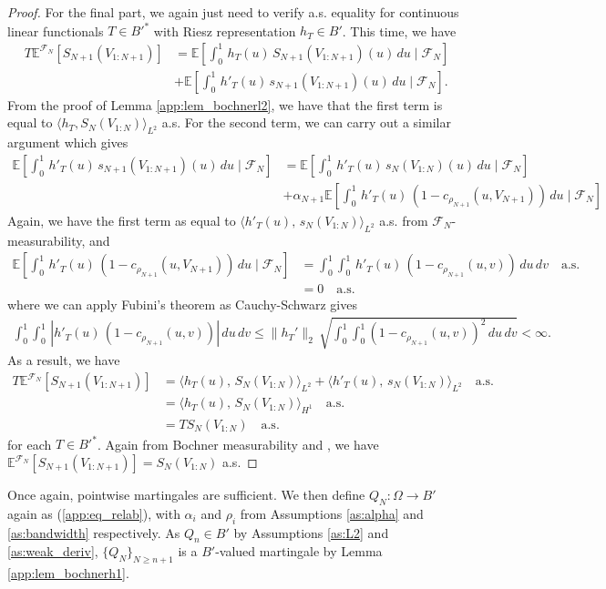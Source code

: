 \documentclass[11pt,a4paper]{article}
\newcommand{\E}{\mathbb{E}}
\begin{document}
\begin{appendices}
\begin{proof}
For the final part, we again just need to verify a.s. equality for continuous linear functionals $T \in {B'}^*$ with Riesz representation $h_T \in B'$. This time, we have
\begin{align*}
    T\E^{\mathcal{F}_N}[S_{N+1}(V_{1:N+1})] &= \E\left[\int_0^1 \, h_T(u) \, S_{N+1}(V_{1:N+1})(u) \, du \mid \mathcal{F}_N\right]\\
    &+ \E\left[\int_0^1 \, h'_T(u) \, s_{N+1}(V_{1:N+1})(u) \, du \mid \mathcal{F}_N\right].
\end{align*}
 From the proof of {Lemma \ref{app:lem_bochnerl2}}, we have that the first term is equal to $\langle h_T, S_N(V_{1:N}) \rangle_{L^2}$ a.s. For the second term, we can carry out a similar argument which gives
\begin{align*}
    \E\left[\int_0^1 \, h'_T(u) \, s_{N+1}(V_{1:N+1})(u) \, du \mid \mathcal{F}_N\right] &=  \E\left[\int_0^1 \, h'_T(u) \, s_{N}(V_{1:N})(u) \, du \mid \mathcal{F}_N\right]\\
    &+ \alpha_{N+1}  \E\left[\int_0^1 \, h'_T(u) \, (1 - c_{\rho_{N+1}}(u,V_{N+1})) \, du \mid \mathcal{F}_N\right]
\end{align*}
Again, we have the first term as equal to $\langle h'_T(u), \, s_{N}(V_{1:N})\rangle_{L^2}$ a.s. from $\mathcal{F}_N$-measurability, and
\begin{align*}
     \E\left[\int_0^1 \, h'_T(u) \, (1 - c_{\rho_{N+1}}(u,V_{N+1})) \, du \mid \mathcal{F}_N\right] &=\int_0^1 \int_0^1 \, h'_T(u) \, (1 - c_{\rho_{N+1}}(u,v)) \, du\, dv \quad \text{a.s.}\\
     &= 0 \quad \text{a.s.}
\end{align*}
where we can apply Fubini's theorem as Cauchy-Schwarz gives
\begin{align*}
    \int_0^1 \int_0^1 \,\left| h'_T(u) \, (1 - c_{\rho_{N+1}}(u,v))\right| \, du\, dv  \leq \|h_T'\|_2 \, \sqrt{\int_0^1 \int_0^1\left(1-c_{\rho_{N+1}}(u,v)\right)^2\, du\,dv} < \infty.
\end{align*}
As a result, we have
\begin{align*}
     T\E^{\mathcal{F}_N}[S_{N+1}(V_{1:N+1})] &= \langle h_T(u), \, S_{N}(V_{1:N})\rangle_{L^2}+ \langle h'_T(u), \, s_{N}(V_{1:N})\rangle_{L^2} \quad \text{a.s.} \\
     &=\langle h_T(u), \, S_{N}(V_{1:N})\rangle_{H^1} \quad \text{a.s.}\\
     &=TS_N(V_{1:N}) \quad \text{a.s.}
\end{align*}
for each $T \in {B'}^*$. Again from Bochner measurability and \citet[Corollary 1.1.25]{Hytonen2016}, we have $\E^{\mathcal{F}_N}[S_{N+1}(V_{1:N+1})] = S_N(V_{1:N})$ a.s.
\end{proof}
Once again, pointwise martingales are sufficient. We then define $Q_N:\Omega \to B'$ again as (\ref{app:eq_relab}), with $\alpha_i$ and $\rho_i$ from {Assumptions \ref{as:alpha}} and  {\ref{as:bandwidth}} respectively. As $Q_n \in B'$ by {Assumptions \ref{as:L2}} and {\ref{as:weak_deriv}}, $\{Q_{N}\}_{N \geq n+1}$ is a $B'$-valued martingale by {Lemma \ref{app:lem_bochnerh1}}.


\end{appendices}
\end{document}
